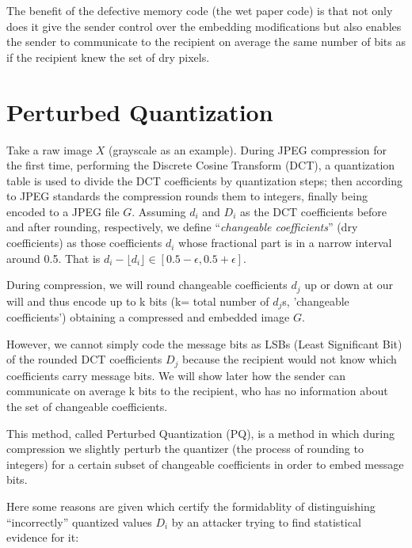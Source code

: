 The benefit of the defective memory code (the wet paper code) is that not only does it give the sender control over the embedding modifications but also enables the sender to communicate to the recipient on average the same number of bits as if the recipient knew the set of dry pixels.

\section{Perturbed Quantization}

Take a raw image $X$ (grayscale as an example). During  JPEG compression for the first time, performing the Discrete Cosine Transform (DCT), a quantization table is used to divide the DCT coefficients by quantization steps; then according to JPEG standards the compression rounds them to integers, finally being encoded to a JPEG file $G$. Assuming $d_i$ and $D_i$ as the DCT coefficients before and after rounding, respectively, we define ``{\it changeable coefficients}'' (dry coefficients) as those coefficients $d_i$ whose fractional part is in a narrow interval around 0.5. That is $d_i - \lfloor d_i \rfloor \in [0.5 - \epsilon, 0.5 + \epsilon ]$.

During compression, we will round changeable coefficients $d_j$ up or down at our will and thus encode up to k bits (k= total number of $d_j$s, 'changeable coefficients') obtaining a compressed and embedded image $G$.

However, we cannot simply code the message bits as LSBs (Least Significant Bit) of the rounded DCT coefficients $D_j$ because the recipient would not know which coefficients carry message bits. We will show later how the sender can communicate on average k bits to the recipient, who has no information about the set of changeable coefficients.

This method, called Perturbed Quantization (PQ), is a method in which during compression we slightly perturb the quantizer (the process of rounding to integers) for a certain subset of changeable coefficients in order to embed message bits.

Here some reasons are given which certify the formidablity of distinguishing “incorrectly” quantized values $D_i$ by an attacker trying to find statistical evidence for it:

